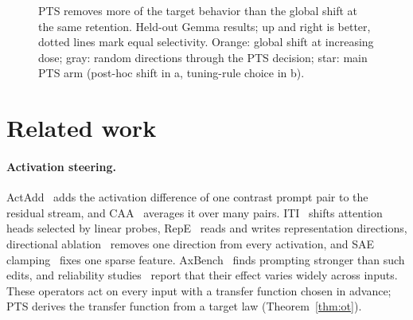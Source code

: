\begin{figure}[t]
\caption{PTS removes more of the target behavior than the global shift at the
same retention. Held-out Gemma results; up and right is better, dotted lines
mark equal selectivity. Orange: global shift at increasing dose; gray: random
directions through the PTS decision; star: main PTS arm (post-hoc shift in a,
tuning-rule choice in b).}
\label{fig:frontier}
\end{figure}

\section{Related work}
\label{sec:related}

\paragraph{Activation steering.} ActAdd~\citep{turner2023actadd} adds the
activation difference of one contrast prompt pair to the residual stream, and
CAA~\citep{rimsky2024caa} averages it over many pairs.
ITI~\citep{li2023iti} shifts attention heads selected by linear probes,
RepE~\citep{zou2023repe} reads and writes representation directions,
directional ablation~\citep{arditi2024refusal} removes one direction from every
activation, and SAE clamping~\citep{templeton2024scaling} fixes one sparse
feature. AxBench~\citep{wu2025axbench} finds prompting stronger than
such edits, and reliability
studies~\citep{tan2024generalisation,braun2025unreliability} report that their
effect varies widely across inputs. These operators act on every input
with a transfer function chosen in advance; PTS derives the transfer function
from a target law (Theorem~\ref{thm:ot}).

